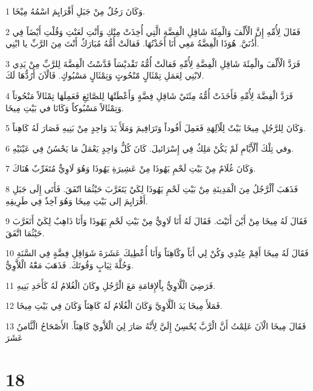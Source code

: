 \par 1 وَكَانَ رَجُلٌ مِنْ جَبَلِ أَفْرَايِمَ اسْمُهُ مِيْخَا.
\par 2 فَقَالَ لِأُمِّهِ إِنَّ الْأَلْفَ وَالْمِئَةَ شَاقِلِ الْفِضَّةِ الَّتِي أُخِذَتْ مِنْكِ وَأَنْتِ لَعَنْتِ وَقُلْتِ أَيْضَاً فِي أُذُنَيَّ. هُوَذَا الْفِضَّةُ مَعِي أَنَا أَخَذْتُهَا. فَقالَتْ أُمُّهُ مُبَارَكٌ أَنْتَ مِنَ الرَّبِّ يا ابْنِي.
\par 3 فَرَدَّ الْأَلْفَ والْمِئَةَ شَاقِلِ الْفِضَّةِ لِأُمِّهِ فَقالَتْ أُمُّهُ تَقْديْسَاً قَدَّسْتُ الْفِضَّةَ لِلرَّبِّ مِنْ يَدِي لابْنِي لِعَمَلِ تِمْثَالٍ مّنْحُوتٍ وَتِمْثَالٍ مَسْبُوكٍ. فَالْآنَ أَرُدُّهَا لَكَ.
\par 4 فَرَدَّ الْفِضَّةَ لِأُمِّهِ فَأَخَذَتْ أُمُّهُ مِئَتَيْ شَاقِلِ فِضَّةٍ وَأَعْطَتْهَا لِلصَّائِغِ فَعَمِلَهَا تِمْثَالاً مَنْحُوتاً وَتِمْثَالاً مَسْبُوكاً وَكَانَا في بَيْتِ مِيخَا.
\par 5 وَكَانَ لِلرَّجُلِ مِيخَا بَيْتٌ لِلْآلِهَةِ فَعَمِلَ أَفُوداً وَتَرَافِيمَ وَمَلَأَ يَدَ وَاحِدٍ مِنْ بَنِيهِ فَصَارَ لَهُ كَاهِناً.
\par 6 وفي تِلْكَ اْلْأَيَّامِ لَمْ يَكُنْ مَلِكٌ فِي إِسْرَائيلَ. كَانَ كُلُّ وَاحِدٍ يَعْمَلُ مَا يَحْسُنُ فِي عَيْنَيْهِ.
\par 7 وَكَانَ غُلَامٌ مِنْ بَيْتِ لَحْمِ يَهُوذَا مِنْ عَشِيرَةِ يَهُوذَا وَهُوَ لَاوِيٌّ مُتَغَرِّبٌ هُنَاكَ.
\par 8 فَذَهَبَ اْلْرَّجُلُ مِنَ الْمَدِينَةِ مِنْ بَيْتِ لَحْمِ يَهُوذَا لِكَيْ يَتَغَرَّبَ حَيْثُمَا اتّفَقَ. فَأَتَى إِلَى جَبَلِ أَفْرَايِمَ إلى بَيْتِ مِيخَا وَهُوَ آخِذٌ فِي طَرِيقِهِ.
\par 9 فَقَالَ لَهُ مِيخَا مِنْ أَيْنَ أَتَيْتَ. فَقَالَ لَهُ أَنَا لَاوِيٌّ مِنْ بَيْتِ لَحْمِ يَهُوذَا وَأَنَا ذَاهِبٌ لِكَيْ أَتَغَرَّبَ حَيْثُمَا اتَّفَقَ.
\par 10 فَقَالَ لَهُ مِيخَا أَقِمْ عِنْدِي وَكُنْ لِي أَبَاً وكّاهِنَاً وَأَنَا أُعْطِيكَ عَشَرَةَ شَوَاقِلِ فِضَّةٍ فِي السَّنَةِ وَحُلَّةَ ثِيَابٍ وَقُوتَكَ. فَذَهَبَ مَعَْهُ الْلاَّوِيُّ.
\par 11 فَرَضِيَ الْلَّاوِيُّ بِاْلإِقامَةِ مَعَ الْرَّجُلِ وكَانَ الْغُلامُ لَهُ كَأَحَدِ بَنِيهِ.
\par 12 فَمَلأَ مِيخَا يَدَ الْلَّاوِيَّ وَكَانَ الْغُلَامُ لَهُ كَاهِنَاً وَكَانَ فِي بَيْتِ مِيخَا.
\par 13 فَقَالَ مِيخَا الْآنَ عَلِمْتُ أَنَّ الْرَّبَّ يُحْسِنُ إِلَيَّ لِأَنَّهُ صَارَ لِيَ الْلاَّويّ كَاهِنَاً. الأَصْحَاحُ الْثَّامنُ عَشَرَ

\chapter{18}

